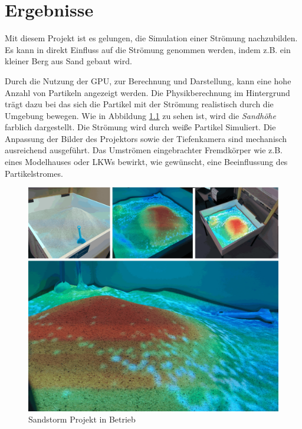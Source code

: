\chapter{Ergebnisse}
\begin{Spacing}{\mylinespace}

Mit diesem Projekt ist es gelungen, die Simulation einer Strömung nachzubilden. Es kann in direkt Einfluss auf die Strömung genommen werden, indem z.B. ein kleiner Berg aus Sand gebaut wird.

Durch die Nutzung der GPU, zur Berechnung und Darstellung, kann eine hohe Anzahl von Partikeln angezeigt werden. Die Physikberechnung im Hintergrund trägt dazu bei das sich die Partikel mit der Strömung realistisch durch die Umgebung bewegen. Wie in Abbildung \ref{fig:Results} zu sehen ist, wird die \textit{Sandhöhe} farblich dargestellt. Die Strömung wird durch weiße Partikel Simuliert. Die Anpassung der Bilder des Projektors sowie der Tiefenkamera sind mechanisch ausreichend ausgeführt. Das Umströmen eingebrachter Fremdkörper wie z.B. eines Modelhauses oder LKWs bewirkt, wie gewünscht, eine Beeinflussung des Partikelstromes. 

\begin{figure}[h!]
	\vspace*{30px}
	\includegraphics[width=\textwidth]{graphics/results.png}	
	\caption{Sandstorm Projekt in Betrieb}
	\label{fig:Results}
\end{figure}

\end{Spacing}
\newpage
\clearpage
